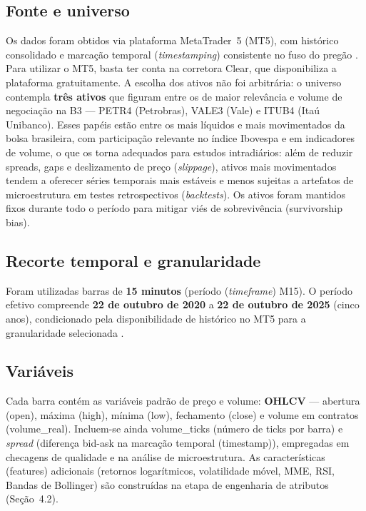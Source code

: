 \subsection{Fonte e universo}
Os dados foram obtidos via plataforma MetaTrader~5 (MT5), com histórico consolidado e marcação temporal (\textit{timestamping}) consistente no fuso do pregão \cite{b3_servicos}. Para utilizar o MT5, basta ter conta na corretora Clear, que disponibiliza a plataforma gratuitamente. A escolha dos ativos não foi arbitrária: o universo contempla \textbf{três ativos} que figuram entre os de maior relevância e volume de negociação na B3 — PETR4 (Petrobras), VALE3 (Vale) e ITUB4 (Itaú Unibanco). Esses papéis estão entre os mais líquidos e mais movimentados da bolsa brasileira, com participação relevante no índice Ibovespa e em indicadores de volume, o que os torna adequados para estudos intradiários: além de reduzir spreads, gaps e deslizamento de preço (\textit{slippage}), ativos mais movimentados tendem a oferecer séries temporais mais estáveis e menos sujeitas a artefatos de microestrutura em testes retrospectivos (\textit{backtests}). Os ativos foram mantidos fixos durante todo o período para mitigar viés de sobrevivência (survivorship bias).

\subsection{Recorte temporal e granularidade}
Foram utilizadas barras de \textbf{15 minutos} (período (\textit{timeframe}) M15). O período efetivo compreende \textbf{22 de outubro de 2020} a \textbf{22 de outubro de 2025} (cinco anos), condicionado pela disponibilidade de histórico no MT5 para a granularidade selecionada \cite{andersen1997intraday}.

\subsection{Variáveis}
Cada barra contém as variáveis padrão de preço e volume: \textbf{OHLCV} --- abertura (open), máxima (high), mínima (low), fechamento (close) e volume em contratos (volume\_real). Incluem-se ainda volume\_ticks (número de ticks por barra) e \textit{spread} (diferença bid-ask na marcação temporal (timestamp)), empregadas em checagens de qualidade e na análise de microestrutura. As características (features) adicionais (retornos logarítmicos, volatilidade móvel, MME, RSI, Bandas de Bollinger) são construídas na etapa de engenharia de atributos (Seção~4.2).

